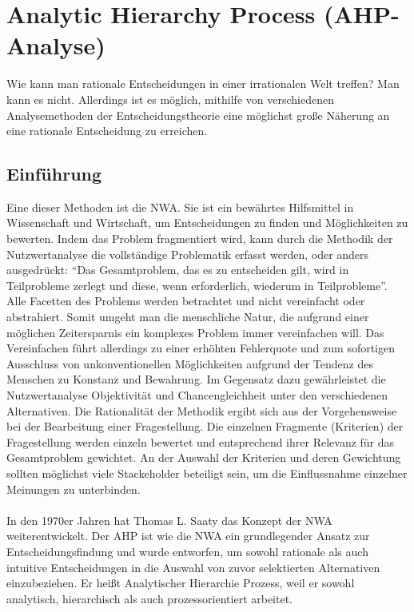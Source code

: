\section{Analytic Hierarchy Process (AHP-Analyse)}
Wie kann man rationale Entscheidungen in einer irrationalen Welt treffen? Man kann es nicht. Allerdings ist es möglich, mithilfe von verschiedenen Analysemethoden der Entscheidungstheorie eine möglichst große Näherung an eine rationale Entscheidung zu erreichen. 
\subsection{Einführung}
Eine dieser Methoden ist die \ac{NWA}. Sie ist ein bewährtes Hilfsmittel in Wissenschaft und Wirtschaft, um Entscheidungen zu finden und Möglichkeiten zu bewerten. Indem das Problem fragmentiert wird, kann durch die Methodik der Nutzwertanalyse die vollständige Problematik erfasst werden, oder anders ausgedrückt: \enquote{Das Gesamtproblem, das es zu entscheiden gilt, wird in Teilprobleme zerlegt und diese, wenn erforderlich, wiederum in Teilprobleme}\autocite[S.1]{Kuehnapfel.2014}. Alle Facetten des Problems werden betrachtet und nicht vereinfacht oder abstrahiert. Somit umgeht man die menschliche Natur, die aufgrund einer möglichen Zeitersparnis ein komplexes Problem immer vereinfachen will. Das Vereinfachen führt allerdings zu einer erhöhten Fehlerquote und zum sofortigen Ausschluss von unkonventionellen Möglichkeiten aufgrund der Tendenz des Menschen zu Konstanz und Bewahrung\autocite[Vgl.][S.1]{Kuehnapfel.2014}. Im Gegensatz dazu gewährleistet die Nutzwertanalyse Objektivität und Chancengleichheit unter den verschiedenen Alternativen.\newline
Die Rationalität der Methodik ergibt sich aus der Vorgehensweise bei der Bearbeitung einer Fragestellung. Die einzelnen Fragmente (Kriterien) der Fragestellung werden einzeln bewertet und entsprechend ihrer Relevanz für das Gesamtproblem gewichtet.\autocite[Vgl.][S.10]{Kuehnapfel.2014} An der Auswahl der Kriterien und deren Gewichtung sollten möglichst viele Stackeholder beteiligt sein, um die Einflussnahme einzelner Meinungen zu unterbinden.\\
\\
In den 1970er Jahren hat Thomas L. Saaty das Konzept der \ac{NWA} weiterentwickelt. Der \ac{AHP} ist wie die \ac{NWA} ein grundlegender Ansatz zur Entscheidungsfindung und wurde entworfen, um sowohl rationale als auch intuitive Entscheidungen in die Auswahl von zuvor selektierten Alternativen einzubeziehen.\autocite[Vgl.][S.1]{Saaty.2012} Er heißt Analytischer Hierarchie Prozess, weil er sowohl analytisch, hierarchisch als auch prozessorientiert arbeitet.\autocite{TUM.2015}
